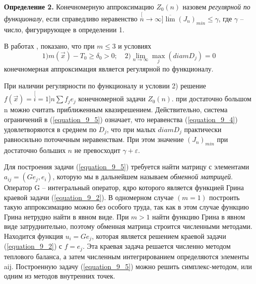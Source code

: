\textbf{Определение 2. }  Конечномерную аппроксимацию $Z_0(n)$ назовем \textit{ регулярной по функционалу}, если справедливо неравенство $\stackrel[n{\to}\infty]{}{\overline{\lim}}(J_n)_{min}\le\gamma$, где $\gamma$ -- число, фигурирующее в определении 1.

В работах \cite{literature_brusencev_2013},\cite{literature_brusencev_2012} показано, что при $m{\le}3$ и условиях
              \begin{equation} \label{equation_9_6}
              1) m(\vec x)-T_0\ge \delta_0>0;\quad 2) \lim_{n{\to}\infty}\max_j(diam D_j)=0
              \end{equation}
конечномерная аппроксимация является регулярной по функционалу.

При наличии регулярности по функционалу и условии 2) решение $f(\vec x){=}{\stackrel[i=1]{n}{\sum}}f_je_j$ конечномерной задачи $Z_0(n)$. при достаточно большом n можно считать приближенным квазирешением. Действительно, система ограничений в (\ref{equation_9_5}) означает, что неравенства (\ref{equation_9_4}) удовлетворяются в среднем по $D_j$, что при малых $diam D_j$ практически равносильно поточечным неравенствам. При этом значение $(J_n)_{min}$ при достаточно больших $n$ не превосходит $\gamma +\varepsilon$.

Для построения задачи (\ref{equation_9_5}) требуется найти матрицу с элементами $a_{ij}{=}(Ge_j,e_i)$, которую мы в дальнейшем называем   \textit{обменной матрицей}. Оператор G -- интегральный оператор, ядро которого является функцией Грина краевой задачи (\ref{equation_9_2}). В одномерном случае $(m{=}1)$ построить такую аппроксимацию можно без особого труда, так как в этом случае функцию Грина нетрудно найти в явном виде. При $m{>}1$ найти функцию Грина в явном виде затруднительно, поэтому обменная матрица строится численными методами. Находится функция $u_i{=}Ge_j$, которая является решением краевой задачи (\ref{equation_9_2}) с $f{=}e_j$. Эта краевая задача решается численно методом теплового баланса, а затем численным интегрированием определяются элементы aij. Построенную задачу (\ref{equation_9_5}) можно решить симплекс-методом, или одним из методов внутренних точек.


